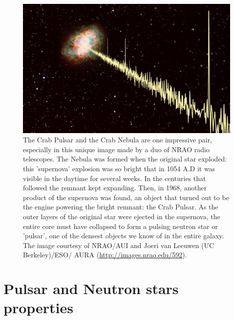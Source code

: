 \begin{figure}[H] 
\centering    
\includegraphics[width=1.0\textwidth]{crab_nebula_pulsar_lo.jpg}
\caption[Crub Pulsar]{The Crab Pulsar and the Crab Nebula are one impressive pair, especially in this unique image made by a duo of NRAO radio telescopes. The Nebula was formed when the original star exploded: this 'supernova' explosion was so bright that in 1054 A.D it was visible in the daytime for several weeks. In the centuries that followed the remnant kept expanding. Then, in 1968, another product of the supernova was found, an object that turned out to be the engine powering the bright remnant: the Crab Pulsar. As the outer layers of the original star were ejected in the supernova, the entire core must have collapsed to form a pulsing neutron star or 'pulsar', one of the densest objects we know of in the entire galaxy.
The image courtesy of NRAO/AUI and Joeri van Leeuwen (UC Berkeley)/ESO/ AURA (\url{http://images.nrao.edu/592}).}
\label{fig:crab}
\end{figure}


\section{Pulsar and Neutron stars properties}

